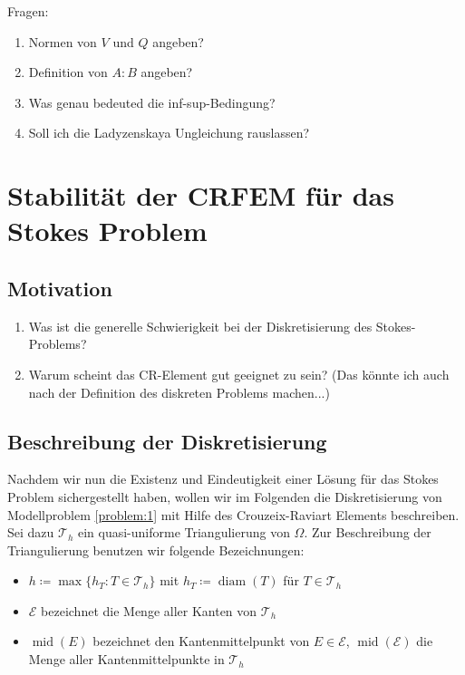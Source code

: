 \documentclass[a4paper]{scrartcl}
\newcommand{\mesh}{\mathcal{T}_h}
\newcommand{\edges}{\mathcal{E}}
\DeclareMathOperator{\diam}{diam}
\DeclareMathOperator{\midOp}{mid}
\theoremstyle{plain}
\theoremstyle{definition}
\theoremstyle{remark}
\begin{document}
{\color{red}
  \noindent Fragen: 
  \begin{enumerate}
  \item Normen von \(V\) und \(Q\) angeben?
  \item Definition von \(A:B\) angeben?
  \item Was genau bedeuted die inf-sup-Bedingung?
  \item Soll ich die Ladyzenskaya Ungleichung rauslassen? 
  \end{enumerate}
}


\section{Stabilität der CRFEM für das Stokes Problem}
\label{sec:stabilitat-der-crfem}

\subsection{Motivation}
\label{sec:motivation}

{\color{red}
  \begin{enumerate}
  \item Was ist die generelle Schwierigkeit bei der Diskretisierung
    des Stokes-Problems?
  \item Warum scheint das CR-Element gut geeignet zu sein? (Das könnte
    ich auch nach der Definition des diskreten Problems machen...)
  \end{enumerate}
}


\subsection{Beschreibung der Diskretisierung}
\label{sec:beschr-der-diskr}

Nachdem wir nun die Existenz und Eindeutigkeit einer Lösung für das
Stokes Problem sichergestellt haben, wollen wir im Folgenden die
Diskretisierung von Modellproblem \ref{problem:1} mit Hilfe des
Crouzeix-Raviart Elements beschreiben. \\

\noindent Sei dazu \(\mesh\) ein quasi-uniforme Triangulierung von
\(\Omega\). Zur Beschreibung der Triangulierung benutzen wir folgende
Bezeichnungen: 
\begin{itemize}
\item \(h \coloneqq \max\{h_T\colon T \in \mesh\}\) mit \(h_T \coloneqq \diam(T)\) für \(T\in \mesh\)
\item \(\edges\) bezeichnet die Menge aller Kanten von \(\mesh\)
\item \(\midOp(E)\) bezeichnet den Kantenmittelpunkt von \(E \in
  \edges\), \(\midOp(\edges)\) die Menge aller Kantenmittelpunkte in \(\mesh\)
\end{itemize}
\end{document}
